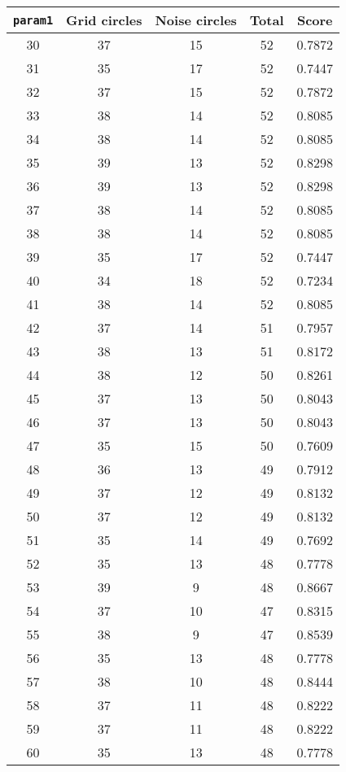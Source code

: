 \documentclass[letterpaper, 12pt]{article}
\begin{document}
\begin{longtable}{|c|c|c|c|c|}
\hline
\textbf{\texttt{param1}} & \textbf{Grid circles} & \textbf{Noise circles} & \textbf{Total} & \textbf{Score} \\
\hline
30 & 37 & 15 & 52 & 0.7872 \\
\hline
31 & 35 & 17 & 52 & 0.7447 \\
\hline
32 & 37 & 15 & 52 & 0.7872 \\
\hline
33 & 38 & 14 & 52 & 0.8085 \\
\hline
34 & 38 & 14 & 52 & 0.8085 \\
\hline
35 & 39 & 13 & 52 & 0.8298 \\
\hline
36 & 39 & 13 & 52 & 0.8298 \\
\hline
37 & 38 & 14 & 52 & 0.8085 \\
\hline
38 & 38 & 14 & 52 & 0.8085 \\
\hline
39 & 35 & 17 & 52 & 0.7447 \\
\hline
40 & 34 & 18 & 52 & 0.7234 \\
\hline
41 & 38 & 14 & 52 & 0.8085 \\
\hline
42 & 37 & 14 & 51 & 0.7957 \\
\hline
43 & 38 & 13 & 51 & 0.8172 \\
\hline
44 & 38 & 12 & 50 & 0.8261 \\
\hline
45 & 37 & 13 & 50 & 0.8043 \\
\hline
46 & 37 & 13 & 50 & 0.8043 \\
\hline
47 & 35 & 15 & 50 & 0.7609 \\
\hline
48 & 36 & 13 & 49 & 0.7912 \\
\hline
49 & 37 & 12 & 49 & 0.8132 \\
\hline
50 & 37 & 12 & 49 & 0.8132 \\
\hline
51 & 35 & 14 & 49 & 0.7692 \\
\hline
52 & 35 & 13 & 48 & 0.7778 \\
\hline
53 & 39 & 9 & 48 & 0.8667 \\
\hline
54 & 37 & 10 & 47 & 0.8315 \\
\hline
55 & 38 & 9 & 47 & 0.8539 \\
\hline
56 & 35 & 13 & 48 & 0.7778 \\
\hline
57 & 38 & 10 & 48 & 0.8444 \\
\hline
58 & 37 & 11 & 48 & 0.8222 \\
\hline
59 & 37 & 11 & 48 & 0.8222 \\
\hline
60 & 35 & 13 & 48 & 0.7778 \\

\end{longtable}
\end{document}
